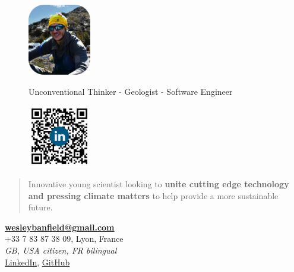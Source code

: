 \documentclass[]{friggeri-cv}
\begin{document}
\begin{figure}[!h]
	\begin{minipage}{0.48\textwidth}
		\begin{flushleft}
			\includegraphics[width=2.75cm]{img/profile_relaxed.png}
		\end{flushleft}
	\end{minipage}\hfill
 	{Unconventional Thinker - Geologist - Software Engineer}
	\begin{minipage}{0.48\textwidth}
		\begin{flushright}
			\includegraphics[width=2.75cm]{img/QR.png}
		\end{flushright}
	\end{minipage}
\end{figure}
\vspace{-0.75cm}

\begin{quote}
\large
Innovative young scientist looking to \textbf{unite cutting edge technology and pressing climate matters} to help provide a more sustainable future.
\\
\end{quote}

\begin{center}
\vspace{6pt}
\href{mailto:wesleybanfield@gmail.com}{\textbf{wesleybanfield@gmail.com}}
\\+33 7 83 87 38 09, Lyon, France
\\\emph{GB, USA citizen, FR bilingual}
\vspace{3pt}
\\\href{https://www.linkedin.com/in/wesleybanfield/}{LinkedIn},
\href{https://github.com/WesleyTheGeolien}{GitHub}
\end{center}
\end{document}
